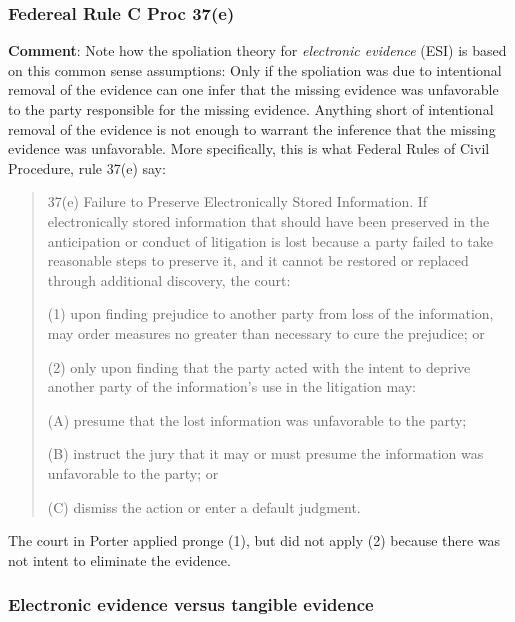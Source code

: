 \documentclass[
  10pt,
  dvipsnames,enabledeprecatedfontcommands]{scrartcl}
\begin{document}

\hypertarget{federeal-rule-c-proc-37e}{%
\subsubsection{Federeal Rule C Proc
37(e)}\label{federeal-rule-c-proc-37e}}

\textbf{Comment}: Note how the spoliation theory for \emph{electronic
evidence} (ESI) is based on this common sense assumptions: Only if the
spoliation was due to intentional removal of the evidence can one infer
that the missing evidence was unfavorable to the party responsible for
the missing evidence. Anything short of intentional removal of the
evidence is not enough to warrant the inference that the missing
evidence was unfavorable. More specifically, this is what Federal Rules
of Civil Procedure, rule 37(e) say:

\begin{quote}
37(e) Failure to Preserve Electronically Stored Information. If electronically stored information that should have been preserved in the anticipation or conduct of litigation is lost because a party failed to take reasonable steps to preserve it, and it cannot be restored or replaced through additional discovery, the court:

(1) upon finding prejudice to another party from loss of the information, may order measures no greater than necessary to cure the prejudice; or

(2) only upon finding that the party acted with the intent to deprive another party of the information’s use in the litigation may:

(A) presume that the lost information was unfavorable to the party;

(B) instruct the jury that it may or must presume the information was unfavorable to the party; or

(C) dismiss the action or enter a default judgment.

\end{quote}

The court in Porter applied pronge (1), but did not apply (2) because
there was not intent to eliminate the evidence.

\hypertarget{electronic-evidence-versus-tangible-evidence}{%
\subsubsection{Electronic evidence versus tangible
evidence}\label{electronic-evidence-versus-tangible-evidence}}
\end{document}
